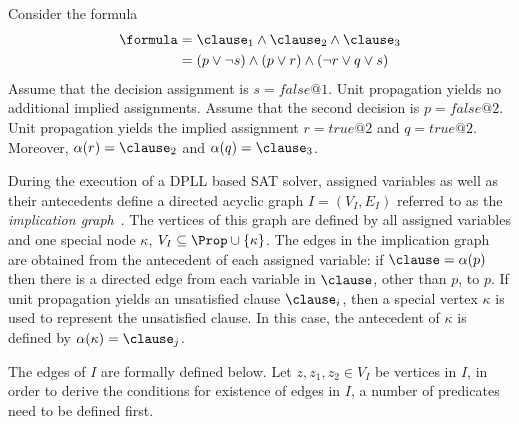 \begin{example}
    Consider the formula 
    \begin{align*}
        \formula & = \clause_1 \land \clause_2 \land \clause_3\\
                 & = (p \lor \neg s) \land (p \lor r) \land (\neg r \lor q \lor s)
    \end{align*}
    Assume that the decision assignment is $s = false @ 1$. Unit propagation
    yields no additional implied assignments. Assume that the second decision is
    $p = false @ 2$. Unit propagation yields the implied assignment $r = true @
    2$ and $q = true @ 2$. Moreover, $\alpha(r) = \clause_2$ and $\alpha(q) =
    \clause_3$.
\end{example}

During the execution of a DPLL based SAT solver, assigned variables as well as
their antecedents define a directed acyclic graph $I = (V_I, E_I)$ referred to as
the \emph{implication graph}~\cite{silva1997grasp}. The vertices of this graph
are defined by all assigned variables and one special node $\kappa$, $V_I
\subseteq \Prop \cup \{\kappa\}$. The edges in the implication graph are
obtained from the antecedent of each assigned variable: if $\clause = \alpha(p)$
then there is a directed edge from each variable in $\clause$, other than $p$, to
$p$. If unit propagation yields an unsatisfied clause $\clause_i$, then a special
vertex $\kappa$ is used to represent the unsatisfied clause. In this case, the
antecedent of $\kappa$ is defined by $\alpha(\kappa) = \clause_j$.

The edges of $I$ are formally defined below. Let $z, z_1, z_2 \in V_I$ be
vertices in $I$, in order to derive the conditions for existence of edges in
$I$, a number of predicates need to be defined first. 

